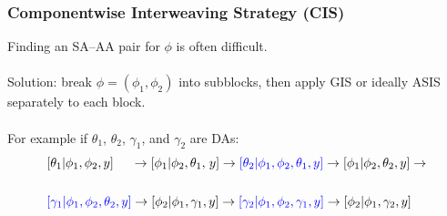 \documentclass[xcolor=dvipsnames]{beamer}
\begin{document}
\begin{frame}
\frametitle{Componentwise Interweaving Strategy (CIS)}
Finding an SA--AA pair for $\phi$ is often difficult.\\~\\

Solution: break $\phi=(\phi_1,\phi_2)$ into subblocks, then apply GIS or ideally ASIS separately to each block.\\~\\

For example if $\theta_1$, $\theta_2$, $\gamma_1$, and $\gamma_2$ are DAs:\\

\begin{align*}
&[\theta_1|\phi_1,\phi_2,y]\phantom{\theta_2,}\hspace{.06cm} \to [\phi_1|\phi_2,\theta_1,\hspace{.05cm}y] \to {\color{blue}[\theta_2|\phi_1,\phi_2,\theta_1,y]} \to [\phi_1|\phi_2,\theta_2,y]\to\\
&\\
&{\color{blue}[\gamma_1|\phi_1,\phi_2,\theta_2,y]} \to [\phi_2|\phi_1,\gamma_1,y] \to {\color{blue}[\gamma_2|\phi_1,\phi_2,\gamma_1,y]} \to [\phi_2|\phi_1,\gamma_2,y]\\
\end{align*}

\end{frame}
\end{document}
